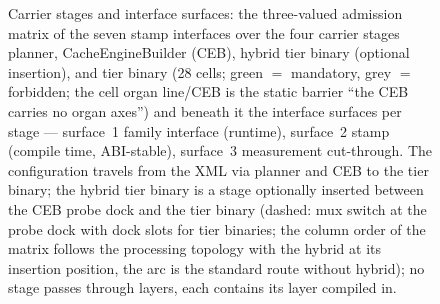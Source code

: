 \begin{nurlang}
\begin{figure}[htbp]
\caption{Carrier stages and interface surfaces: the three-valued admission matrix of the seven stamp interfaces over the four carrier stages planner, CacheEngineBuilder (CEB), hybrid tier binary (optional insertion), and tier binary (28 cells; green $=$ mandatory, grey $=$ forbidden; the cell organ line/CEB is the static barrier \enquote{the CEB carries no organ axes}) and beneath it the interface surfaces per stage --- surface~1 family interface (runtime), surface~2 stamp (compile time, ABI-stable), surface~3 measurement cut-through. The configuration travels from the XML via planner and CEB to the tier binary; the hybrid tier binary is a stage optionally inserted between the CEB probe dock and the tier binary (dashed: mux switch at the probe dock with dock slots for tier binaries; the column order of the matrix follows the processing topology with the hybrid at its insertion position, the arc is the standard route without hybrid); no stage passes through layers, each contains its layer compiled in.}\label{fig:traeger-flaechen}
\end{figure}
\end{nurlang}
